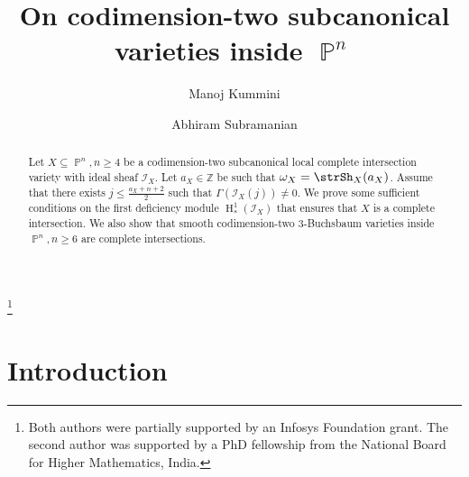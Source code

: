 \documentclass[11pt,a4paper]{amsart}
\theoremstyle{plain}
\theoremstyle{definition}
\newcommand{\calI}{\mathcal I}
\newcommand{\ints}{\mathbb{Z}}
\DeclareMathOperator{\projective}{\mathbb{P}}
\DeclareMathOperator{\homology}{H}
\begin{document}
\title{On codimension-two subcanonical varieties inside $\projective^n$}
\author{Manoj Kummini}
\address{Chennai Mathematical Institute, Siruseri, Tamilnadu 603103. India}

\author{Abhiram Subramanian}
\address{Chennai Mathematical Institute, Siruseri, Tamilnadu 603103. India}

\thanks{Both authors were partially supported by an Infosys Foundation
grant. The second author was supported by a PhD fellowship from the
National Board for Higher Mathematics, India.}


\begin{abstract}
Let $X \subseteq \projective^n, n \geq 4$ be a codimension-two subcanonical
local complete intersection variety with ideal sheaf $\calI_X$. Let $a_X
\in \ints$ be such that
$\omega_X = \strSh_X(a_X)$. Assume that there exists 
$\displaystyle j \leq \frac{a_X+n+2}{2}$ such that 
$\Gamma(\calI_X(j)) \neq 0$.
We prove some sufficient conditions on the first deficiency module
$\homology^1_*(\calI_X)$ that ensures that $X$ is a complete intersection.
We also show that smooth codimension-two $3$-Buchsbaum varieties inside 
$\projective^n, n \geq 6$ are complete intersections.
\end{abstract}

\maketitle

\section{Introduction}
\end{document}
